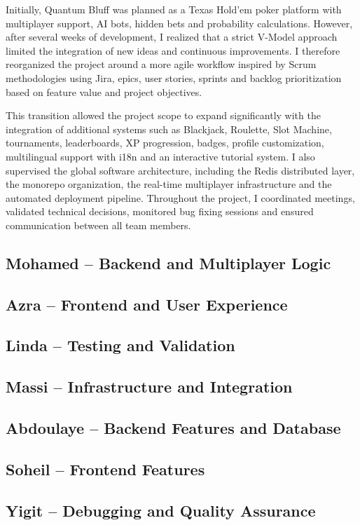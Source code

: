 \documentclass[11pt,a4paper]{article}
\begin{document}
Initially, Quantum Bluff was planned as a Texas Hold'em poker platform with multiplayer support, AI bots, hidden bets and probability calculations. However, after several weeks of development, I realized that a strict V-Model approach limited the integration of new ideas and continuous improvements. I therefore reorganized the project around a more agile workflow inspired by Scrum methodologies using Jira, epics, user stories, sprints and backlog prioritization based on feature value and project objectives.

This transition allowed the project scope to expand significantly with the integration of additional systems such as Blackjack, Roulette, Slot Machine, tournaments, leaderboards, XP progression, badges, profile customization, multilingual support with i18n and an interactive tutorial system. I also supervised the global software architecture, including the Redis distributed layer, the monorepo organization, the real-time multiplayer infrastructure and the automated deployment pipeline. Throughout the project, I coordinated meetings, validated technical decisions, monitored bug fixing sessions and ensured communication between all team members.
\subsection{Mohamed -- Backend and Multiplayer Logic}
\subsection{Azra -- Frontend and User Experience}
\subsection{Linda -- Testing and Validation}
\subsection{Massi -- Infrastructure and Integration}
\subsection{Abdoulaye -- Backend Features and Database}
\subsection{Soheil -- Frontend Features}
\subsection{Yigit -- Debugging and Quality Assurance}
\end{document}
